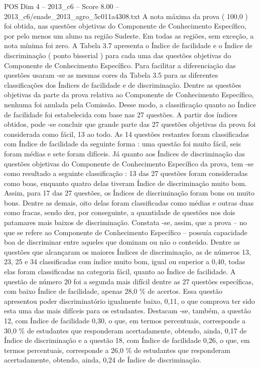 \begin{textsample}{POS Dim 4 – 2013\_c6 – Score 8.00 – 2013\_c6/enade\_2013\_agro\_5c011a4308.txt}
A nota máxima da prova ( 100,0 ) foi obtida, nas questões objetivas do Componente de Conhecimento Específico, por pelo menos um aluno na região Sudeste.
Em todas as regiões, sem exceção, a nota mínima foi zero.
A Tabela 3.7 apresenta o Índice de facilidade e o Índice de discriminação ( ponto bisserial ) para cada uma das questões objetivas do Componente de Conhecimento Específico.
Para facilitar a diferenciação das questões usaram -se as mesmas cores da Tabela 3.5 para as diferentes classificações dos Índices de facilidade e de discriminação.
Dentre as questões objetivas da parte da prova relativa ao Componente de Conhecimento Específico, nenhuma foi anulada pela Comissão.
Desse modo, a classificação quanto ao Índice de facilidade foi estabelecida com base nas 27 questões.
A partir dos índices obtidos, pode -se concluir que grande parte das 27 questões objetivas da prova foi considerada como fácil, 13 ao todo.
As 14 questões restantes foram classificadas com Índice de facilidade da seguinte forma : uma questão foi muito fácil, seis foram médias e sete foram difíceis.
Já quanto aos Índices de discriminação das questões objetivas do Componente de Conhecimento Específico da prova, tem -se como resultado a seguinte classificação : 13 das 27 questões foram consideradas como boas, enquanto quatro delas tiveram Índice de discriminação muito bom.
Assim, para 17 das 27 questões, os Índices de discriminação foram bons ou muito bons.
Dentre as demais, oito delas foram classificadas como médias e outras duas como fracas, sendo dez, por conseguinte, a quantidade de questões nos dois patamares mais baixos de discriminação.
Constata -se, assim, que a prova – no que se refere ao Componente de Conhecimento Específico – possuía capacidade boa de discriminar entre aqueles que dominam ou não o conteúdo.
Dentre as questões que alcançaram os maiores Índices de discriminação, as de números 13, 23, 25 e 34 classificadas com índice muito bom, igual ou superior a 0,40, todas elas foram classificadas na categoria fácil, quanto ao Índice de facilidade.
A questão de número 20 foi a segunda mais difícil dentre as 27 questões específicas, com baixo Índice de facilidade, apenas 28,0 \% de acertos.
Essa questão apresentou poder discriminatório igualmente baixo, 0,11, o que comprova ter sido esta uma das mais difíceis para os estudantes.
Destacam -se, também, a questão 12, com Índice de facilidade 0,30, o que, em termos percentuais, corresponde a 30,0 \% de estudantes que responderam acertadamente, obtendo, ainda, 0,17 de Índice de discriminação e a questão 18, com Índice de facilidade 0,26, o que, em termos percentuais, corresponde a 26,0 \% de estudantes que responderam acertadamente, obtendo, ainda, 0,24 de Índice de discriminação.

\end{textsample}
